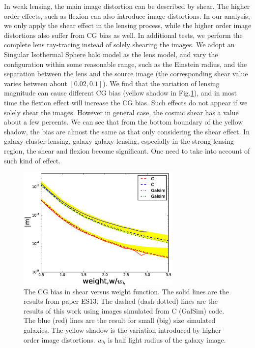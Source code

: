 \documentclass[useAMS,usenatbib]{mn2e}
\begin{document}
In weak lensing, the main image distortion can be described by shear.
The higher order effects, such as flexion
\citep[e.g.][]{2002ApJ...564...65G,bacon2006} can also introduce image
distortions. In our analysis, we only apply the shear effect in the
lensing process, while the higher order image distortions also suffer
from CG bias as well. In additional tests, we perform the complete
lens ray-tracing instead of solely shearing the images. We adopt an
Singular Isothermal Sphere halo model as the lens model, and vary the
configuration within some reasonable range, such as the Einstein
radius, and the separation between the lens and the source image (the
corresponding shear value varies between about $[0.02, 0.1]$). We find
that the variation of lensing magnitude can cause different CG bias
(yellow shadow in Fig.\ref{fig:biasofweight}), and in most time the
flexion effect will increase the CG bias. Such effects do not appear
if we solely shear the images. However in general case, the cosmic
shear has a value about a few percents. We can see that from the
bottom boundary of the yellow shadow, the bias are almost the same as that
only considering the shear effect. In galaxy cluster lensing, galaxy-galaxy
lensing, especially in the strong lensing region, the shear and
flexion become significant. One need to take into account of such kind
of effect.


%
\begin{figure}
\centerline{\includegraphics[width=8.0cm]{cvsgalsim.eps}}
\caption{The CG bias in shear versus weight function.  The
  solid lines are the results from paper ES13. The dashed
  (dash-dotted) lines are the results of this work using images
  simulated from C (GalSim) code. The blue (red) lines are the result
  for small (big) size simulated galaxies. The yellow shadow is the
  variation introduced by higher order image distortions. $w_h$ is
  half light radius of the galaxy image.}
\label{fig:biasofweight}
\end{figure}
\end{document}

